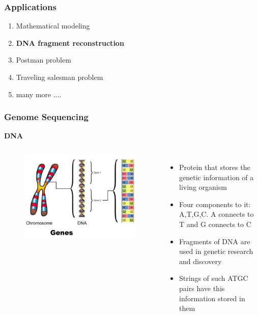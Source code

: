 \documentclass{beamer}
\begin{document}

\begin{frame}
\frametitle{Applications}
\begin{enumerate}
\item Mathematical modeling
\item {\color{red}\textbf{DNA fragment reconstruction}}
\item Postman problem
\item Traveling salesman problem

\item many more ....
\end{enumerate}
\end{frame}


\begin{frame}
\frametitle{Genome Sequencing}
\textbf{DNA}
\begin{columns}[c]


\begin{figure}[h]
\includegraphics[scale = 0.35]{dna.jpg}
\end{figure}



\begin{itemize}
\item Protein that stores the genetic information of a living organism
\pause
\item Four components to it: A,T,G,C. A connects to T and G connects to C
\pause
\item Fragments of DNA are used in genetic research and discovery
\item Strings of such {\color{red}ATGC} pairs have this information stored in them	
\end{itemize}


\end{columns}
\end{frame}
\end{document}
